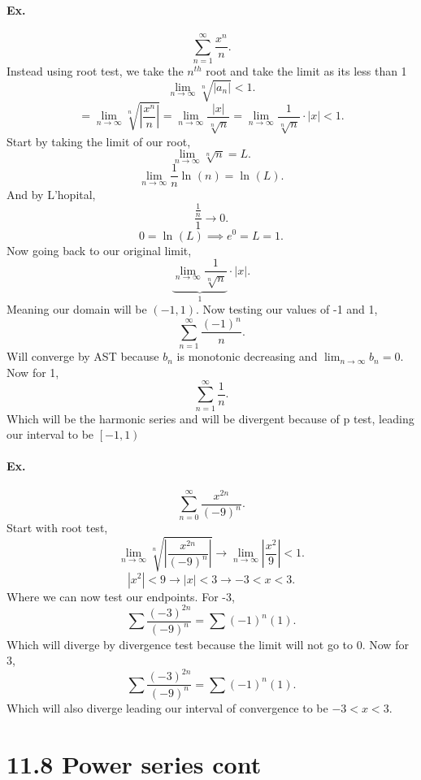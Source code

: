 \paragraph{Ex.}
\[
\sum_{ n=1 } ^{ \infty } \frac{ x^{ n } }{ n }
.\] 
Instead using root test, we take the $ n^{ th }$ root and take the limit as its less than 1
\[
\lim_{ n \to \infty} \sqrt[ n ]{ \left| a_n \right| } < 1
.\] 
\[
=\lim_{ n \to \infty} \sqrt[ n ]{ \left| \frac{ x^{ n } }{ n } \right| } = \lim_{ n \to \infty} \frac{ \left| x \right| }{ \sqrt[ n ]{ n }  } = \lim_{ n \to \infty} \frac{ 1 }{ \sqrt[ n ]{ n }  } \cdot \left| x \right| < 1
.\] 
Start by taking the limit of our root,
\[
\lim_{ n \to \infty} \sqrt[ n ]{ n } =L
.\] 
\[
\lim_{ n \to \infty} \frac{ 1 }{ n } \ln^{  } \left( n \right) = \ln^{  } \left( L \right)
.\] 
And by L'hopital,
\[
\frac{ \frac{ 1 }{ n }  }{ 1 }\to 0
.\] 
\[
0=\ln^{  } \left( L \right) \implies e^{ 0 }= L = 1
.\] 
Now going back to our original limit,
\[
	\underbrace{\lim_{ n \to \infty} \frac{ 1 }{ \sqrt[ n ]{ n }  } }_{1} \cdot \left| x \right|
.\] 
Meaning our domain will be $ \left( -1,1 \right)  $. Now testing our values of -1 and 1,
\[
\sum_{ n=1 } ^{ \infty } \frac{ \left( -1 \right) ^{ n } }{ n }
.\] 
Will converge by AST because $ b_n $ is monotonic decreasing and $ \lim_{ n \to \infty} b_n = 0 $. Now for 1,
\[
\sum_{ n=1 } ^{ \infty } \frac{ 1 }{ n } 
.\] 
Which will be the harmonic series and will be divergent because of p test, leading our interval to be $ \left[ -1,1 \right) $

\paragraph{Ex.}
\[
\sum_{ n=0 } ^{ \infty } \frac{ x^{ 2n } }{ \left( -9 \right) ^{ n } }
.\] 
Start with root test,
\[
\lim_{ n \to \infty} \sqrt[ n ]{ \left| \frac{ x^{ 2n } }{ \left( -9 \right) ^{ n } } \right| } \to \lim_{ n \to \infty} \left| \frac{ x^2 }{ 9 }  \right| < 1
.\] 
\[
\left| x^2 \right|<9 \to \left| x \right| < 3 \to -3< x < 3
.\] 
Where we can now test our endpoints. For -3,
\[
\sum_{ } ^{  } \frac{ \left( -3 \right)^{ 2n }  }{ \left( -9 \right) ^{ n } }= \sum_{  } ^{  } \left( -1 \right) ^{ n }\left( 1 \right) 
.\] 
Which will diverge by divergence test because the limit will not go to 0. Now for 3,
\[
\sum_{  } ^{  } \frac{ \left( -3 \right) ^{ 2n } }{ \left( -9 \right) ^{ n } }= \sum_{  } ^{  } \left( -1 \right) ^{ n }\left( 1 \right) 
.\] 
Which will also diverge leading our interval of convergence to be $ -3 < x < 3 $.
\section*{11.8 Power series cont}%
\label{sec:11.8 Power series cont}
